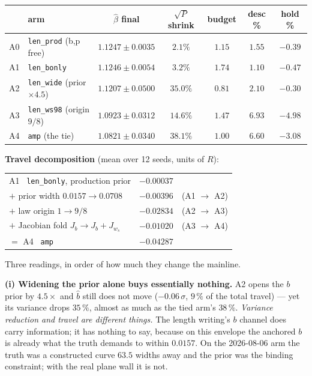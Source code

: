 \documentclass[11pt,a4paper,fontset=none]{ctexart}
\begin{document}
\begin{center}
\begin{tabular}{llccccc}
\toprule
 & arm & $\hat{\beta}$ final & $\sqrt{P}$ shrink & budget & desc \% & hold \% \\
\midrule
A0 & \texttt{len\_prod} \small(b,p free) & $1.1247 \pm 0.0035$ & $2.1\%$  & $1.15$ & $1.55$ & $-0.39$ \\
A1 & \texttt{len\_bonly}                 & $1.1246 \pm 0.0054$ & $3.2\%$  & $1.74$ & $1.10$ & $-0.47$ \\
A2 & \texttt{len\_wide} \small(prior $\times 4.5$) & $1.1207 \pm 0.0500$ & $35.0\%$ & $0.81$ & $2.10$ & $-0.30$ \\
A3 & \texttt{len\_ws98} \small(origin $9/8$) & $1.0923 \pm 0.0312$ & $14.6\%$ & $1.47$ & $6.93$ & $-4.98$ \\
A4 & \texttt{amp} \small(the tie)        & $1.0821 \pm 0.0340$ & $38.1\%$ & $1.00$ & $6.60$ & $-3.08$ \\
\bottomrule
\end{tabular}
\end{center}

\textbf{Travel decomposition} (mean over 12 seeds, units of $R$):
\begin{center}
\begin{tabular}{lrr}
\toprule
A1 \ \texttt{len\_bonly}, production prior & $-0.00037$ & \\
$+$ prior width $0.0157 \to 0.0708$        & $-0.00396$ & (A1 $\to$ A2) \\
$+$ law origin $1 \to 9/8$                 & $-0.02834$ & (A2 $\to$ A3) \\
$+$ Jacobian fold $J_b \to J_b + J_{w_s}$  & $-0.01020$ & (A3 $\to$ A4) \\
\midrule
$=$ A4 \ \texttt{amp}                      & $-0.04287$ & \\
\bottomrule
\end{tabular}
\end{center}

Three readings, in order of how much they change the mainline.

\textbf{(i) Widening the prior alone buys essentially nothing.} A2 opens the
$b$ prior by $4.5\times$ and $\hat{b}$ still does not move ($-0.06\,\sigma$,
$9\,\%$ of the total travel) --- yet its variance drops $35\,\%$, almost as
much as the tied arm's $38\,\%$. \emph{Variance reduction and travel are
different things.} The length writing's $b$ channel does carry information;
it has nothing to say, because on this envelope the anchored $b$ is already
what the truth demands to within $0.0157$. On the 2026-08-06 arm the truth was
a constructed curve $63.5$ widths away and the prior was the binding
constraint; with the real plane wall it is not.
\end{document}
